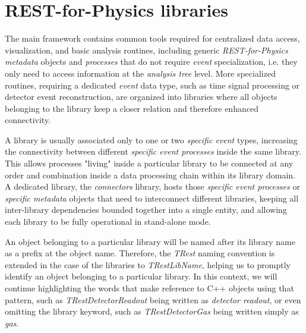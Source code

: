\section{REST-for-Physics libraries}

\label{sec:libraries}

The main framework contains common tools required for centralized data access, visualization, and basic analysis routines, including generic \emph{REST-for-Physics} \emph{metadata} objects and \emph{processes} that do not require \emph{event} specialization, i.e. they only need to access information at the \emph{analysis tree} level. More specialized routines, requiring a dedicated \emph{event} data type, such as time signal processing or detector event reconstruction, are organized into libraries where all objects belonging to the library keep a closer relation and therefore enhanced connectivity.

A library is usually associated only to one or two \emph{specific event} types, increasing the connectivity between different \emph{specific event processes} inside the same library. This allows processes "living" inside a particular library to be connected at any order and combination inside a data processing chain within its library domain. A dedicated library, the \emph{connectors} library, hosts those \emph{specific event processes} or \emph{specific metadata} objects that need to interconnect different libraries, keeping all inter-library dependencies bounded together into a single entity, and allowing each library to be fully operational in stand-alone mode.

An object belonging to a particular library will be named after its library name as a prefix at the object name. Therefore, the \emph{TRest} naming convention is extended in the case of the libraries to \emph{TRestLibName}, helping us to promptly identify an object belonging to a particular library. In this context, we will continue highlighting the words that make reference to C++ objects using that pattern, such as \emph{TRestDetectorReadout} being written as \emph{detector readout}, or even omitting the library keyword, such as \emph{TRestDetectorGas} being written simply as \emph{gas}.

